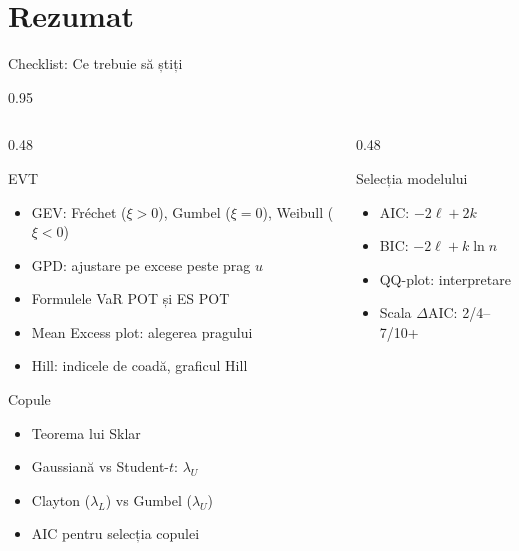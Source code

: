 \documentclass[9pt, aspectratio=169, t]{beamer}
\begin{document}
\section{Rezumat}

\begin{frame}{Checklist: Ce trebuie să știți}
    \begin{cminipage}{0.95\textwidth}
\begin{columns}[T]
\begin{column}{0.48\textwidth}
\begin{block}{EVT}
\begin{itemize}\setlength{\itemsep}{0pt}
    \item[$\square$] GEV: Fréchet ($\xi > 0$), Gumbel ($\xi = 0$), Weibull ($\xi < 0$)
    \item[$\square$] GPD: ajustare pe excese peste prag $u$
    \item[$\square$] Formulele VaR POT și ES POT
    \item[$\square$] Mean Excess plot: alegerea pragului
    \item[$\square$] Hill: indicele de coadă, graficul Hill
\end{itemize}
\end{block}
\begin{block}{Copule}
\begin{itemize}\setlength{\itemsep}{0pt}
    \item[$\square$] Teorema lui Sklar
    \item[$\square$] Gaussiană vs Student-$t$: $\lambda_U$
    \item[$\square$] Clayton ($\lambda_L$) vs Gumbel ($\lambda_U$)
    \item[$\square$] AIC pentru selecția copulei
\end{itemize}
\end{block}
\end{column}
\begin{column}{0.48\textwidth}
\begin{block}{Selecția modelului}
\begin{itemize}\setlength{\itemsep}{0pt}
    \item[$\square$] AIC: $-2\ell + 2k$
    \item[$\square$] BIC: $-2\ell + k\ln n$
    \item[$\square$] QQ-plot: interpretare
    \item[$\square$] Scala $\Delta$AIC: 2/4--7/10+

\end{itemize}
\end{block}
\end{column}
\end{columns}
\end{cminipage}
\end{frame}
\end{document}
